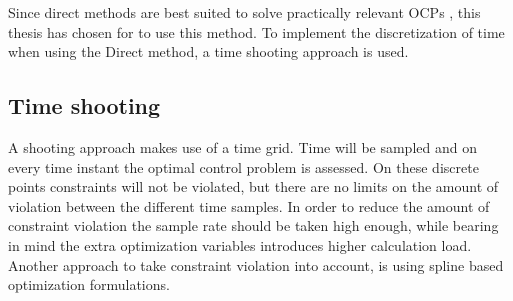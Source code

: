 Since direct methods are best suited to solve practically relevant OCPs \cite{Mercy2018}, this thesis has chosen for to use this method. To implement the discretization of time when using the Direct method, a time shooting approach is used.

\subsection{Time shooting}
A shooting approach makes use of a time grid. Time will be sampled and on every time instant the optimal control problem is assessed. On these discrete points constraints will not be violated, but there are no limits on the amount of violation between the different time samples. In order to reduce the amount of constraint violation the sample rate should be taken high enough, while bearing in mind the extra optimization variables introduces higher calculation load. Another approach to take constraint violation into account, is using spline based optimization formulations. \cite{Mercy2018}\\

